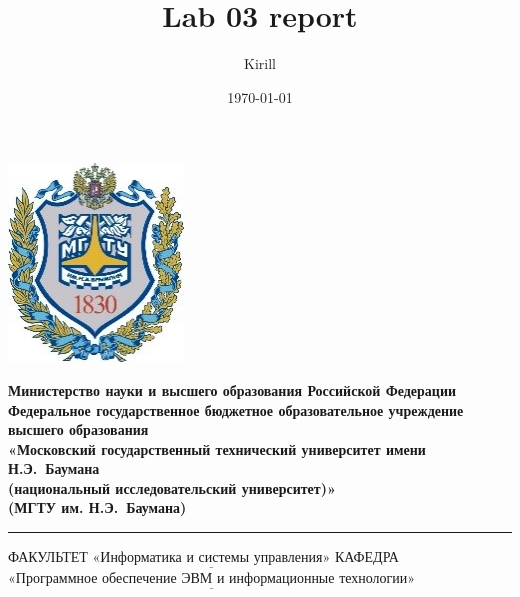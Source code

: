 \documentclass[14pt,russian]{scrartcl}
\title{Lab 03 report}
\author{Kirill}
\date{\today}
\begin{document}
\thispagestyle{empty}

\noindent \begin{minipage}{0.15\textwidth}
	\includegraphics[width=\linewidth]{b_logo}
\end{minipage}
\noindent\begin{minipage}{0.85\textwidth}\centering
	\textbf{Министерство науки и высшего образования Российской Федерации}\\
	\textbf{Федеральное государственное бюджетное образовательное учреждение высшего образования}\\
	\textbf{«Московский государственный технический университет имени Н.Э.~Баумана}\\
	\textbf{(национальный исследовательский университет)»}\\
	\textbf{(МГТУ им. Н.Э.~Баумана)}
\end{minipage}

\noindent\rule{16cm}{3pt}
\newline\newline
\noindent ФАКУЛЬТЕТ $\underline{\text{«Информатика и системы управления»}}$ \newline\newline
\noindent КАФЕДРА $\underline{\text{«Программное обеспечение ЭВМ и информационные технологии»}}$\newline\newline
\end{document}
